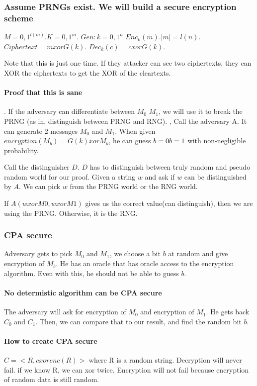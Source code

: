 \subsubsection{Assume PRNGs exist. We will build a secure encryption scheme}

$M = {0, 1}^{l(m)}. K = {0, 1}^m$.
$Gen: k = {0, 1}^n$
$Enc_k(m). |m| = l(n)$. 
$Ciphertext = m xor G(k)$.
$Dec_k(c) = c xor G(k)$.


Note that this is just one time. If they attacker can see two ciphertexts, they can XOR the ciphertexts to get the XOR of the cleartexts.

\paragraph{Proof that this is sane}.
If the adversary can differentiate between $M_0$ $M_1$, we will use it to break the PRNG (as in, distinguish between PRNG and RNG).
, 
Call the adversary A. It can generate 2 messages $M_0$ and $M_1$. When given $encryption(M_b) = G(k) xor M_b$, he can guess $b = 0 \/ b = 1$ with non-negligible probability.

Call the distinguisher $D$. $D$ has to distinguish between truly random and pseudo random world for our proof.
Given a string $w$ and ask if $w$ can be distinguished by $A$. We can pick $w$ from the PRNG world or the RNG world.

If $A(w xor M0, w xor M1)$ gives us the  correct value(can distinguish), then we are using the PRNG. Otherwise, it is the RNG.


\subsubsection{CPA secure}

Adversary gets to pick $M_0$ and $M_1$, we choose a bit $b$ at random and give encryption of $M_b$. He has an oracle that has oracle access to the encryption algorithm. Even with this, he should not be able to guess $b$.

\paragraph{No determistic algorithm can be CPA secure}

The adversary will ask for encryption of $M_0$ and encryption of $M_1$. He gets back $C_0$ and $C_1$. Then, we can compare that to our result, and find the random bit $b$.


\paragraph{How to create CPA secure}
$C = <R, c xor enc(R)>$ where R is a random string.
Decryption will never fail. if we know R, we can xor twice.
Encryption will not fail because encryption of random data is still random.

